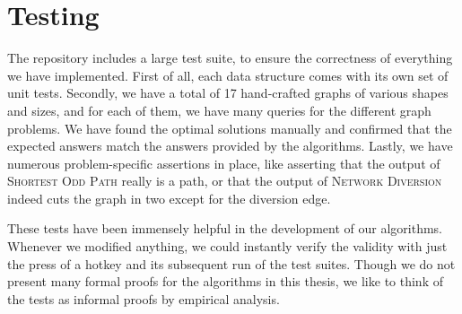\section{Testing}
The repository includes a large test suite, to ensure the correctness of everything we have implemented. First of all, each data structure comes with its own set of unit tests. Secondly, we have a total of 17 hand-crafted graphs of various shapes and sizes, and for each of them, we have many queries for the different graph problems. We have found the optimal solutions manually and confirmed that the expected answers match the answers provided by the algorithms. Lastly, we have numerous problem-specific assertions in place, like asserting that the output of \textsc{Shortest Odd Path} really is a path, or that the output of \textsc{Network Diversion} indeed cuts the graph in two except for the diversion edge.

These tests have been immensely helpful in the development of our algorithms. Whenever we modified anything, we could instantly verify the validity with just the press of a hotkey and its subsequent run of the test suites. Though we do not present many formal proofs for the algorithms in this thesis, we like to think of the tests as informal proofs by empirical analysis.